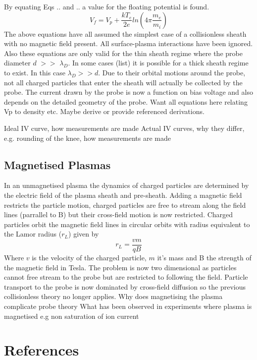 \documentclass[12pt]{article}
\def\be{\begin{equation}}
\def\ee{\end{equation}}
\begin{document}
By equating Eqs .. and .. a value for the floating potential is found. 
\be 
V_f = V_p + \frac{k T_e}{2 e} ln\left(4 \pi\frac{m_e}{m_i}\right)
\ee
The above equations have all assumed the simplest case of a collisionless sheath with no magnetic field present. All surface-plasma interactions have been ignored. Also these equations are only valid for the thin sheath regime where the probe diameter $d$ $>>$ $\lambda_D$. In some cases (list) it is possible for a thick sheath regime to exist. In this case $\lambda_D >> d$. Due to their orbital motions around the probe, not all charged particles that enter the sheath will actually be collected by the probe. The current drawn by the probe is now a function on bias voltage and also depends on the detailed geometry of the probe. 
Want all equations here relating Vp to density etc. Maybe derive or provide referenced derivations. 

Ideal IV curve, how measurements are made 
Actual IV curves, why they differ, e.g. rounding of the knee, how measurements are made 


 
\subsection{Magnetised Plasmas}
In an unmagnetised plasma the dynamics of charged particles are determined by the electric field of the plasma sheath and pre-sheath. Adding a magnetic field restricts the particle motion, charged particles are free to stream along the field lines (parrallel to B) but their cross-field motion is now restricted. Charged particles orbit the magnetic field lines in circular orbits with radius equivalent to the Lamor radius ($r_L$) given by
\be 
r_L = \frac{v m}{q B}
\ee
Where $v$ is the velocity of the charged particle, $m$ it's mass and B the strength of the magnetic field in Tesla. 
The problem is now two dimensional as particles cannot free stream to the probe but are restricted to following the field. Particle transport to the probe is now dominated by cross-field diffusion so the previous collisionless theory no longer applies. 
Why does magnetising the plasma complicate probe theory
What has been observed in experiments where plasma is magnetised e.g non saturation of ion current 


\section{References}
%
\end{document}
